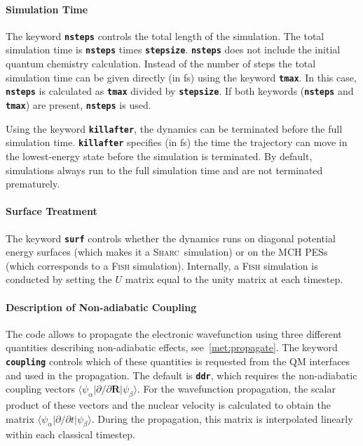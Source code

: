 \documentclass[a4paper,11pt,DIV=15,openany,twoside=false]{scrbook}
\newcommand{\sharc}{\textsc{Sharc}}
\newcommand{\ttt}[1]{\textbf{\texttt{#1}}}
\newcommand{\VEC}[1]{\ensuremath{\mathbf{#1}}}
\begin{document}
\paragraph{Simulation Time}

The keyword \ttt{nsteps} controls the total length of the simulation. The total simulation time is \ttt{nsteps} times \ttt{stepsize}. \ttt{nsteps} does not include the initial quantum chemistry calculation. Instead of the number of steps the total simulation time can be given directly (in fs) using the keyword \ttt{tmax}. In this case, \ttt{nsteps} is calculated as \ttt{tmax} divided by \ttt{stepsize}. If both keywords (\ttt{nsteps} and \ttt{tmax}) are present, \ttt{nsteps} is used.

Using the keyword \ttt{killafter}, the dynamics can be terminated before the full simulation time. \ttt{killafter} specifies (in fs) the time the trajectory can move in the lowest-energy state before the simulation is terminated. By default, simulations always run to the full simulation time and are not terminated prematurely.

\paragraph{Surface Treatment}

The keyword \ttt{surf} controls whether the dynamics runs on diagonal potential energy surfaces (which makes it a \sharc\ simulation) or on the MCH PESs (which corresponds to a \textsc{Fish} simulation). Internally, a \textsc{Fish} simulation is conducted by setting the $U$ matrix equal to the unity matrix at each timestep. 

\paragraph{Description of Non-adiabatic Coupling}

The code allows to propagate the electronic wavefunction using three different quantities describing non-adiabatic effects, see~\ref{met:propagate}. The keyword \ttt{coupling} controls which of these quantities is requested from the QM interfaces and used in the propagation. The default is \ttt{ddr}, which requires the non-adiabatic coupling vectors $\langle\psi_\alpha|\partial/\partial \VEC{R}|\psi_\beta\rangle$. For the wavefunction propagation, the scalar product of these vectors and the nuclear velocity is calculated to obtain the matrix $\langle\psi_\alpha|\partial/\partial t|\psi_\beta\rangle$. During the propagation, this matrix is interpolated linearly within each classical timestep.
\end{document}
